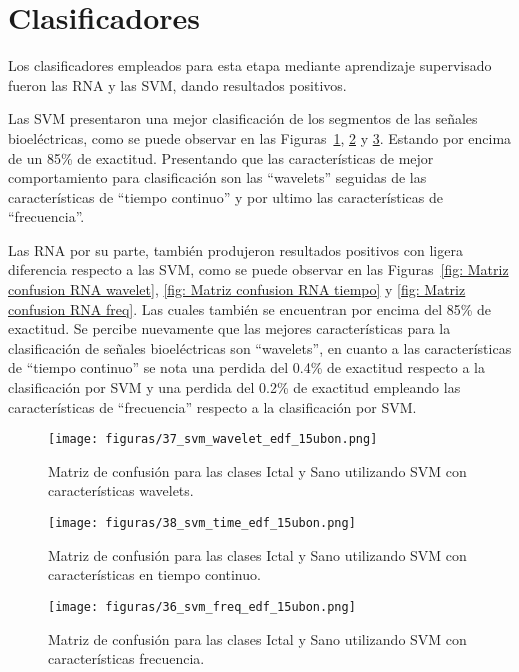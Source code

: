 \section{Clasificadores}
Los clasificadores empleados para esta etapa mediante aprendizaje supervisado fueron las RNA y las SVM, dando resultados positivos. 

Las SVM presentaron una mejor clasificación de los segmentos de las  señales bioeléctricas, como se puede observar en las Figuras~\ref{fig: Matriz confusion svm wavelets}, \ref{fig: Matriz confusion svm time} y  \ref{fig: Matriz confusion svm freq}. Estando por encima de un 85\% de exactitud. Presentando que las características de mejor comportamiento para clasificación son las  ``wavelets'' seguidas de las características de ``tiempo continuo'' y por ultimo las características de ``frecuencia''.

Las RNA por su parte, también produjeron resultados positivos con ligera diferencia respecto a las SVM, como se puede observar en las Figuras~\ref{fig: Matriz confusion RNA wavelet}, \ref{fig: Matriz confusion RNA tiempo} y \ref{fig: Matriz confusion RNA freq}. Las cuales también se encuentran por encima del 85\% de exactitud. Se percibe nuevamente que las mejores características para la clasificación de señales bioeléctricas son ``wavelets'', en cuanto a las  características de ``tiempo continuo'' se nota una perdida del 0.4\% de exactitud respecto a la clasificación por SVM y una perdida del 0.2\% de exactitud empleando las características de ``frecuencia'' respecto a la clasificación por SVM.

\begin{figure}[H]
    \centering
    \texttt{[image: figuras/37\_svm\_wavelet\_edf\_15ubon.png]}
    \caption{Matriz de confusión para las clases Ictal y Sano utilizando SVM con características wavelets.}
    \label{fig: Matriz confusion svm wavelets}
\end{figure}
\begin{figure}[H]
    \centering
    \texttt{[image: figuras/38\_svm\_time\_edf\_15ubon.png]}
    \caption{Matriz de confusión para las clases Ictal y Sano utilizando SVM con características en tiempo continuo.}
    \label{fig: Matriz confusion svm time}
\end{figure}
\begin{figure}[H]
    \centering
    \texttt{[image: figuras/36\_svm\_freq\_edf\_15ubon.png]}
    \caption{Matriz de confusión para las clases Ictal y Sano utilizando SVM con características frecuencia.}
    \label{fig: Matriz confusion svm freq}
\end{figure}

